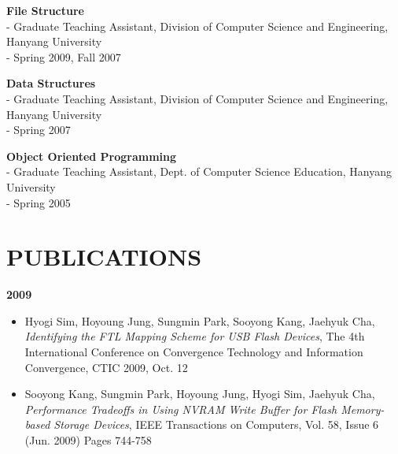 \documentclass{res}
\begin{document}
\begin{resume}
   {\bf File Structure}
      \vspace{0.02in}\\
      - {\small Graduate Teaching Assistant, Division of Computer Science and
      Engineering, Hanyang University}\\
      - {\small Spring 2009, Fall 2007}

   {\bf Data Structures}
      \vspace{0.02in}\\
      - {\small Graduate Teaching Assistant, Division of Computer Science and
      Engineering, Hanyang University}\\
      - {\small Spring 2007}

   {\bf Object Oriented Programming}
      \vspace{0.02in}\\
      - {\small Graduate Teaching Assistant, Dept. of Computer Science
      Education, Hanyang University}\\
      - {\small Spring 2005}

\section{PUBLICATIONS} 
\vspace{0.1in}

{\bf 2009}
 \begin{itemize}
  \item Hyogi Sim, Hoyoung Jung, Sungmin Park, Sooyong Kang, Jaehyuk Cha,
  {\it Identifying the FTL Mapping Scheme for USB Flash Devices},
  The 4th International Conference on Convergence Technology
  and Information Convergence, CTIC 2009, Oct. 12
  \item Sooyong Kang, Sungmin Park, Hoyoung Jung, Hyogi Sim, Jaehyuk Cha,
  {\it Performance Tradeoffs in Using NVRAM Write Buffer for Flash Memory-based
  Storage Devices},
  IEEE Transactions on Computers, Vol. 58, Issue 6 (Jun. 2009) Pages 744-758
 \end{itemize}


\end{resume}
\end{document}
